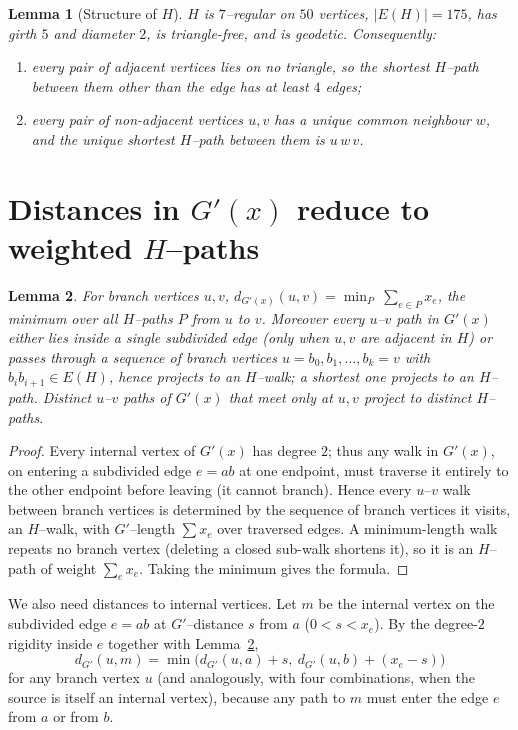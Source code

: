 \documentclass{amsart}
\newtheorem{lemma}{Lemma}
\theoremstyle{definition}
\begin{document}
\begin{lemma}[Structure of $H$]\label{lem:struct}
$H$ is $7$--regular on $50$ vertices, $|E(H)|=175$, has girth $5$ and diameter
$2$, is triangle-free, and is geodetic. Consequently:
\begin{enumerate}
\item every pair of adjacent vertices lies on no triangle, so the shortest
$H$--path between them other than the edge has at least $4$ edges;
\item every pair of non-adjacent vertices $u,v$ has a unique common neighbour
$w$, and the unique shortest $H$--path between them is $u\,w\,v$.
\end{enumerate}
\end{lemma}

\section{Distances in $G'(x)$ reduce to weighted $H$--paths}

\begin{lemma}\label{lem:distbranch}
For branch vertices $u,v$,
$d_{G'(x)}(u,v)=\min_{P}\ \sum_{e\in P}x_e$, the minimum over all $H$--paths $P$
from $u$ to $v$. Moreover every $u$--$v$ path in $G'(x)$ either lies inside a
single subdivided edge (only when $u,v$ are adjacent in $H$) or passes through a
sequence of branch vertices $u=b_0,b_1,\dots,b_k=v$ with $b_ib_{i+1}\in E(H)$,
hence projects to an $H$--walk; a shortest one projects to an $H$--path. Distinct
$u$--$v$ paths of $G'(x)$ that meet only at $u,v$ project to distinct
$H$--paths.
\end{lemma}

\begin{proof}
Every internal vertex of $G'(x)$ has degree $2$; thus any walk in $G'(x)$, on
entering a subdivided edge $e=ab$ at one endpoint, must traverse it entirely to
the other endpoint before leaving (it cannot branch). Hence every $u$--$v$ walk
between branch vertices is determined by the sequence of branch vertices it
visits, an $H$--walk, with $G'$--length $\sum x_e$ over traversed edges. A
minimum-length walk repeats no branch vertex (deleting a closed sub-walk
shortens it), so it is an $H$--path of weight $\sum_{e}x_e$. Taking the minimum
gives the formula.
\end{proof}

We also need distances to internal vertices. Let $m$ be the internal vertex on
the subdivided edge $e=ab$ at $G'$--distance $s$ from $a$ ($0<s<x_e$). By the
degree-$2$ rigidity inside $e$ together with Lemma~\ref{lem:distbranch},
\begin{equation}\label{eq:internaldist}
d_{G'}(u,m)=\min\big(d_{G'}(u,a)+s,\ d_{G'}(u,b)+(x_e-s)\big)
\end{equation}
for any branch vertex $u$ (and analogously, with four combinations, when the
source is itself an internal vertex), because any path to $m$ must enter the
edge $e$ from $a$ or from $b$.
\end{document}
